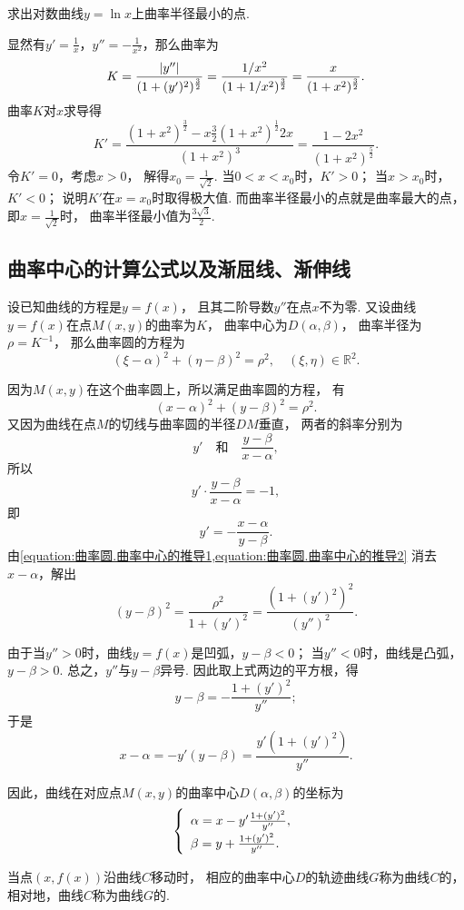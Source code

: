 \begin{example}
求出对数曲线\(y = \ln x\)上曲率半径最小的点.
\begin{solution}
显然有\(y' = \frac{1}{x}\)，\(y'' = -\frac{1}{x^2}\)，那么曲率为\[
	K = \frac{\abs{y''}}{(1+(y')^2)^{\frac32}}
	= \frac{1/x^2}{(1+1/x^2)^{\frac32}}
	= \frac{x}{(1+x^2)^{\frac32}}.
\]
曲率\(K\)对\(x\)求导得\[
	K' = \frac{(1+x^2)^{\frac32} - x \frac32 (1+x^2)^{\frac12} 2x}{(1+x^2)^3}
	= \frac{1 - 2x^2}{(1+x^2)^{\frac52}}.
\]
令\(K' = 0\)，考虑\(x>0\)，
解得\(x_0 = \frac{1}{\sqrt{2}}\).
当\(0<x<x_0\)时，\(K'>0\)；
当\(x>x_0\)时，\(K'<0\)；
说明\(K'\)在\(x=x_0\)时取得极大值.
而曲率半径最小的点就是曲率最大的点，
即\(x = \frac{1}{\sqrt{2}}\)时，
曲率半径最小值为\(\frac{3\sqrt{3}}{2}\).
\end{solution}
\end{example}

\subsection{曲率中心的计算公式以及渐屈线、渐伸线}
设已知曲线的方程是\(y=f(x)\)，
且其二阶导数\(y''\)在点\(x\)不为零.
又设曲线\(y=f(x)\)在点\(M(x,y)\)的曲率为\(K\)，
曲率中心为\(D(\alpha,\beta)\)，
曲率半径为\(\rho=K^{-1}\)，
那么曲率圆的方程为\[
	(\xi-\alpha)^2+(\eta-\beta)^2=\rho^2,
	\quad(\xi,\eta)\in\mathbb{R}^2.
\]

因为\(M(x,y)\)在这个曲率圆上，所以满足曲率圆的方程，
有\begin{equation}\label{equation:曲率圆.曲率中心的推导1}
	(x-\alpha)^2+(y-\beta)^2=\rho^2.
\end{equation}
又因为曲线在点\(M\)的切线与曲率圆的半径\(DM\)垂直，
两者的斜率分别为\[
	y'
	\quad\text{和}\quad
	\frac{y-\beta}{x-\alpha},
\]
所以\[
	y' \cdot \frac{y-\beta}{x-\alpha} = -1,
\]
即\begin{equation}\label{equation:曲率圆.曲率中心的推导2}
	y' = -\frac{x-\alpha}{y-\beta}.
\end{equation}
由\cref{equation:曲率圆.曲率中心的推导1,equation:曲率圆.曲率中心的推导2}
消去\(x-\alpha\)，解出\[
	(y-\beta)^2
	=\frac{\rho^2}{1+(y')^2}
	=\frac{(1+(y')^2)^2}{(y'')^2}.
\]

由于当\(y''>0\)时，曲线\(y=f(x)\)是凹弧，\(y-\beta<0\)；
当\(y''<0\)时，曲线是凸弧，\(y-\beta>0\).
总之，\(y''\)与\(y-\beta\)异号.
因此取上式两边的平方根，得\[
	y-\beta
	=-\frac{1+(y')^2}{y''};
\]
于是\[
	x-\alpha
	=-y'(y-\beta)
	=\frac{y'(1+(y')^2)}{y''}.
\]

因此，曲线在对应点\(M(x,y)\)的曲率中心\(D(\alpha,\beta)\)的坐标为
\begin{equation}
	\left\{ \def\arraystretch{1.5} \begin{array}{l}
		\alpha = x - y' \frac{1 + (y')^2}{y''}, \\
		\beta = y + \frac{1 + (y')^2}{y''}.
	\end{array} \right.
\end{equation}

当点\((x,f(x))\)沿曲线\(C\)移动时，
相应的曲率中心\(D\)的轨迹曲线\(G\)称为曲线\(C\)的，
相对地，曲线\(C\)称为曲线\(G\)的.
